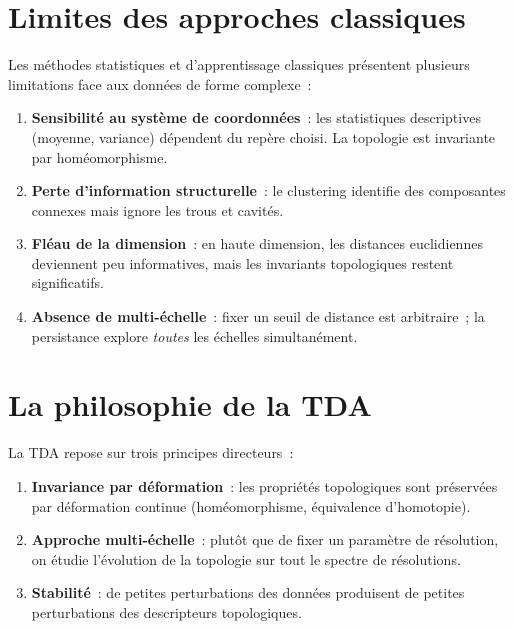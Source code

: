 \section{Limites des approches classiques}

Les m\'ethodes statistiques et d'apprentissage classiques pr\'esentent
plusieurs limitations face aux donn\'ees de forme complexe~:

\begin{enumerate}
  \item \textbf{Sensibilit\'e au syst\`eme de coordonn\'ees}~: les
        statistiques descriptives (moyenne, variance) d\'ependent du
        rep\`ere choisi. La topologie est invariante par hom\'eomorphisme.
  \item \textbf{Perte d'information structurelle}~: le clustering
        identifie des composantes connexes mais ignore les trous et
        cavit\'es.
  \item \textbf{Fl\'eau de la dimension}~: en haute dimension, les
        distances euclidiennes deviennent peu informatives, mais les
        invariants topologiques restent significatifs.
  \item \textbf{Absence de multi-\'echelle}~: fixer un seuil de distance
        est arbitraire~; la persistance explore \emph{toutes} les
        \'echelles simultan\'ement.
\end{enumerate}

\section{La philosophie de la TDA}

La TDA repose sur trois principes directeurs~:

\begin{definition}
\begin{enumerate}
  \item \textbf{Invariance par d\'eformation}~: les propri\'et\'es
        topologiques sont pr\'eserv\'ees par d\'eformation continue
        (hom\'eomorphisme, \'equivalence d'homotopie).
  \item \textbf{Approche multi-\'echelle}~: plut\^ot que de fixer un
        param\`etre de r\'esolution, on \'etudie l'\'evolution de la
        topologie sur tout le spectre de r\'esolutions.
  \item \textbf{Stabilit\'e}~: de petites perturbations des donn\'ees
        produisent de petites perturbations des descripteurs topologiques.
\end{enumerate}
\end{definition}

